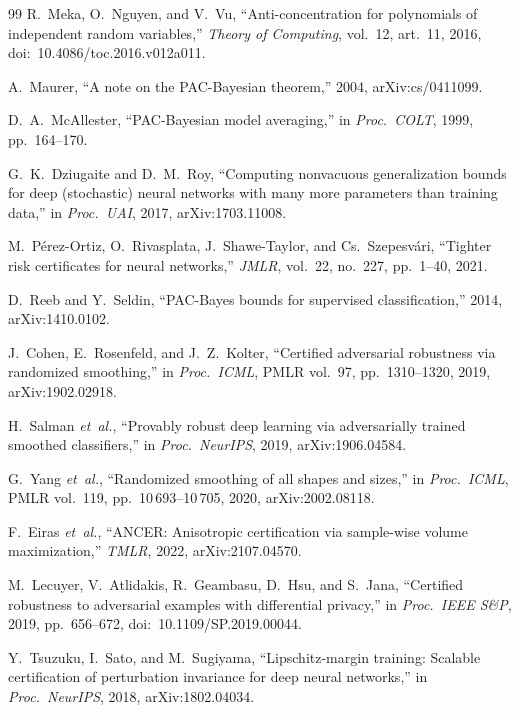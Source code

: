 \documentclass{ieeeaccess}
\begin{document}
\begin{thebibliography}{99}
 R.~Meka, O.~Nguyen, and V.~Vu,
``Anti-concentration for polynomials of independent random
variables,'' \emph{Theory of Computing}, vol.~12, art.~11, 2016,
doi:~10.4086/toc.2016.v012a011.

 A.~Maurer, ``A note on the PAC-Bayesian
theorem,'' 2004, arXiv:cs/0411099.

 D.~A.~McAllester, ``PAC-Bayesian
model averaging,'' in \emph{Proc.\ COLT}, 1999, pp.~164--170.

 G.~K.~Dziugaite and D.~M.~Roy,
``Computing nonvacuous generalization bounds for deep (stochastic)
neural networks with many more parameters than training data,''
in \emph{Proc.\ UAI}, 2017, arXiv:1703.11008.

 M.~P\'erez-Ortiz, O.~Rivasplata,
J.~Shawe-Taylor, and Cs.~Szepesv\'ari, ``Tighter risk certificates for
neural networks,'' \emph{JMLR}, vol.~22, no.~227, pp.~1--40, 2021.

 D.~Reeb and Y.~Seldin, ``PAC-Bayes bounds for
supervised classification,'' 2014, arXiv:1410.0102.

 J.~Cohen, E.~Rosenfeld, and J.~Z.~Kolter,
``Certified adversarial robustness via randomized smoothing,''
in \emph{Proc.\ ICML}, PMLR vol.~97, pp.~1310--1320, 2019,
arXiv:1902.02918.

 H.~Salman \textit{et~al.}, ``Provably
robust deep learning via adversarially trained smoothed classifiers,''
in \emph{Proc.\ NeurIPS}, 2019, arXiv:1906.04584.

 G.~Yang \textit{et~al.}, ``Randomized
smoothing of all shapes and sizes,'' in \emph{Proc.\ ICML},
PMLR vol.~119, pp.~10\,693--10\,705, 2020, arXiv:2002.08118.

 F.~Eiras \textit{et~al.}, ``ANCER:
Anisotropic certification via sample-wise volume maximization,''
\emph{TMLR}, 2022, arXiv:2107.04570.

 M.~Lecuyer, V.~Atlidakis, R.~Geambasu,
D.~Hsu, and S.~Jana, ``Certified robustness to adversarial examples
with differential privacy,'' in \emph{Proc.\ IEEE S\&P}, 2019,
pp.~656--672, doi:~10.1109/SP.2019.00044.

 Y.~Tsuzuku, I.~Sato, and M.~Sugiyama,
``Lipschitz-margin training: Scalable certification of perturbation
invariance for deep neural networks,'' in \emph{Proc.\ NeurIPS}, 2018,
arXiv:1802.04034.


\end{thebibliography}
\end{document}
